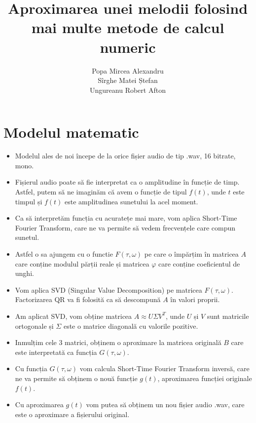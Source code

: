 \documentclass[12pt]{article}
\begin{document}
\title{Aproximarea unei melodii folosind mai multe metode de calcul numeric}

\author{
  Popa Mircea Alexandru \\
  Sîrghe Matei Ștefan \\ 
  Ungureanu Robert Afton
}

\maketitle

\section{Modelul matematic}\label{Modelul}
\begin{itemize}
\item Modelul ales de noi începe de la orice fișier audio de tip .wav, 16 bitrate, mono.\\
\item Fișierul audio poate să fie interpretat ca o amplitudine în funcție de timp. Astfel, putem să ne imaginăm că avem o funcție de tipul $f(t)$, unde $t$ este timpul și $f(t)$ este amplitudinea sunetului la acel moment.\\
\item Ca să interpretăm funcția cu acuratețe mai mare, vom aplica Short-Time Fourier Transform, care ne va permite să vedem frecvențele care compun sunetul.\\
\item Astfel o sa ajungem cu o functie $F(\tau,\omega)$ pe care o împărțim în matricea $A$ care conține modulul părții reale și matricea $\varphi$ care conține coeficientul de unghi. \\
\item Vom aplica SVD (Singular Value Decomposition) pe matricea $F(\tau,\omega)$. Factorizarea QR va fi folosită  ca să descompună $A$ în valori proprii.\\
\item Am aplicat SVD, vom obține matricea $A \approx U \Sigma V^T$, unde $U$ și $V$ sunt matricile ortogonale și $\Sigma$ este o matrice diagonală cu valorile pozitive.\\
\item Inmulțim cele 3 matrici, obținem o aproximare la matricea originală $B$ care este interpretată ca funcția $G(\tau,\omega)$. \\ 
\item Cu funcția $G(\tau,\omega)$ vom calcula Short-Time Fourier Transform inversă, care ne va permite să obținem o nouă funcție $g(t)$, aproximarea funcției originale $f(t)$.\\
\item Cu aproximarea $g(t)$ vom putea să obținem un nou fișier audio .wav, care este o aproximare a fișierului original.\\
\end{itemize}
\end{document}
